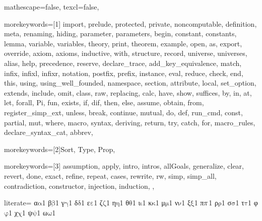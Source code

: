 
 {

  mathescape=false,
  texcl=false,

  morekeywords=[1]{
    import, prelude, protected, private, noncomputable, definition, meta, renaming,
    hiding, parameter, parameters, begin, constant, constants,
    lemma, variable, variables, theory,
    print, theorem, example,
    open, as, export, override, axiom, axioms, inductive, with,
    structure, record, universe, universes,
    alias, help, precedence, reserve, declare_trace, add_key_equivalence,
    match, infix, infixl, infixr, notation, postfix, prefix, instance,
    eval, reduce, check, end, this,
    using, using_well_founded, namespace, section,
    attribute, local, set_option, extends, include, omit, class,
    raw, replacing,
    calc, have, show, suffices, by, in, at, let, forall, Pi, fun,
    exists, if, dif, then, else, assume, obtain, from, register_simp_ext, unless, break, continue,
    mutual, do, def, run_cmd, const,
    partial, mut, where, macro, syntax, deriving,
  return, try, catch, for, macro_rules, declare_syntax_cat, abbrev},

  morekeywords=[2]{Sort, Type, Prop},

  morekeywords=[3]{
    assumption,
    apply, intro, intros, allGoals,
    generalize, clear, revert, done, exact,
    refine, repeat, cases, rewrite, rw,
    simp, simp_all, contradiction,
    constructor, injection,
    induction,
  },

  literate=
  {α}{{\ensuremath{\mathrm{\alpha}}}}1
  {β}{{\ensuremath{\mathrm{\beta}}}}1
  {γ}{{\ensuremath{\mathrm{\gamma}}}}1
  {δ}{{\ensuremath{\mathrm{\delta}}}}1
  {ε}{{\ensuremath{\mathrm{\varepsilon}}}}1
  {ζ}{{\ensuremath{\mathrm{\zeta}}}}1
  {η}{{\ensuremath{\mathrm{\eta}}}}1
  {θ}{{\ensuremath{\mathrm{\theta}}}}1
  {ι}{{\ensuremath{\mathrm{\iota}}}}1
  {κ}{{\ensuremath{\mathrm{\kappa}}}}1
  {μ}{{\ensuremath{\mathrm{\mu}}}}1
  {ν}{{\ensuremath{\mathrm{\nu}}}}1
  {ξ}{{\ensuremath{\mathrm{\xi}}}}1
  {π}{{\ensuremath{\mathrm{\mathnormal{\pi}}}}}1
  {ρ}{{\ensuremath{\mathrm{\rho}}}}1
  {σ}{{\ensuremath{\mathrm{\sigma}}}}1
  {τ}{{\ensuremath{\mathrm{\tau}}}}1
  {φ}{{\ensuremath{\mathrm{\varphi}}}}1
  {χ}{{\ensuremath{\mathrm{\chi}}}}1
  {ψ}{{\ensuremath{\mathrm{\psi}}}}1
  {ω}{{\ensuremath{\mathrm{\omega}}}}1

}
